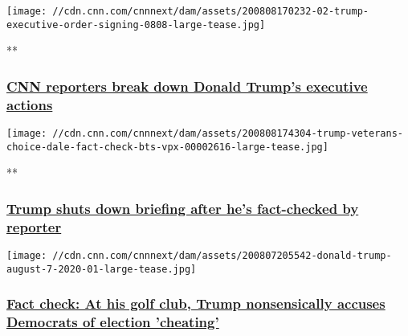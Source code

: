 \href{/videos/politics/2020/08/08/trump-signs-executive-orders-unemployment-stimulus-holmes-dale-nr-vpx.cnn}{}

\texttt{[image: //cdn.cnn.com/cnnnext/dam/assets/200808170232-02-trump-executive-order-signing-0808-large-tease.jpg]}

**

\hypertarget{cnn-reporters-break-down-donald-trumps-executive-actions-1}{%
\subsubsection{\texorpdfstring{\href{/videos/politics/2020/08/08/trump-signs-executive-orders-unemployment-stimulus-holmes-dale-nr-vpx.cnn}{CNN
reporters break down Donald Trump's executive
actions}}{CNN reporters break down Donald Trump's executive actions}}\label{cnn-reporters-break-down-donald-trumps-executive-actions-1}}

\href{/videos/politics/2020/08/08/trump-veterans-choice-dale-fact-check-bts-vpx.cnn}{}

\texttt{[image: //cdn.cnn.com/cnnnext/dam/assets/200808174304-trump-veterans-choice-dale-fact-check-bts-vpx-00002616-large-tease.jpg]}

**

\hypertarget{trump-shuts-down-briefing-after-hes-fact-checked-by-reporter}{%
\subsubsection{\texorpdfstring{\href{/videos/politics/2020/08/08/trump-veterans-choice-dale-fact-check-bts-vpx.cnn}{Trump
shuts down briefing after he's fact-checked by
reporter}}{Trump shuts down briefing after he's fact-checked by reporter}}\label{trump-shuts-down-briefing-after-hes-fact-checked-by-reporter}}

\href{/2020/08/07/politics/donald-trump-press-briefing-democrats-cheating-election-fact-check/index.html}{}

\texttt{[image: //cdn.cnn.com/cnnnext/dam/assets/200807205542-donald-trump-august-7-2020-01-large-tease.jpg]}

\hypertarget{fact-check-at-his-golf-club-trump-nonsensically-accuses-democrats-of-election-cheating-}{%
\subsubsection{\texorpdfstring{\href{/2020/08/07/politics/donald-trump-press-briefing-democrats-cheating-election-fact-check/index.html}{Fact
check: At his golf club, Trump nonsensically accuses Democrats of
election 'cheating'
}}{Fact check: At his golf club, Trump nonsensically accuses Democrats of election 'cheating' }}\label{fact-check-at-his-golf-club-trump-nonsensically-accuses-democrats-of-election-cheating-}}

